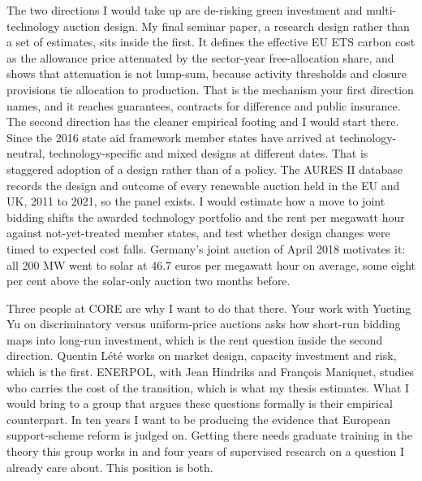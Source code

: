 \documentclass[a4paper,11pt]{article}
\begin{document}
The two directions I would take up are de-risking green investment and multi-technology auction design. My final seminar paper, a research design rather than a set of estimates, sits inside the first. It defines the effective EU ETS carbon cost as the allowance price attenuated by the sector-year free-allocation share, and shows that attenuation is not lump-sum, because activity thresholds and closure provisions tie allocation to production. That is the mechanism your first direction names, and it reaches guarantees, contracts for difference and public insurance. The second direction has the cleaner empirical footing and I would start there. Since the 2016 state aid framework member states have arrived at technology-neutral, technology-specific and mixed designs at different dates. That is staggered adoption of a design rather than of a policy. The AURES II database records the design and outcome of every renewable auction held in the EU and UK, 2011 to 2021, so the panel exists. I would estimate how a move to joint bidding shifts the awarded technology portfolio and the rent per megawatt hour against not-yet-treated member states, and test whether design changes were timed to expected cost falls. Germany's joint auction of April 2018 motivates it: all 200 MW went to solar at 46.7 euros per megawatt hour on average, some eight per cent above the solar-only auction two months before.

Three people at CORE are why I want to do that there. Your work with Yueting Yu on discriminatory versus uniform-price auctions asks how short-run bidding maps into long-run investment, which is the rent question inside the second direction. Quentin L\'et\'e works on market design, capacity investment and risk, which is the first. ENERPOL, with Jean Hindriks and Fran\c{c}ois Maniquet, studies who carries the cost of the transition, which is what my thesis estimates. What I would bring to a group that argues these questions formally is their empirical counterpart. In ten years I want to be producing the evidence that European support-scheme reform is judged on. Getting there needs graduate training in the theory this group works in and four years of supervised research on a question I already care about. This position is both.

\vspace{0.5mm}


\vspace{0.8mm}
\end{document}
